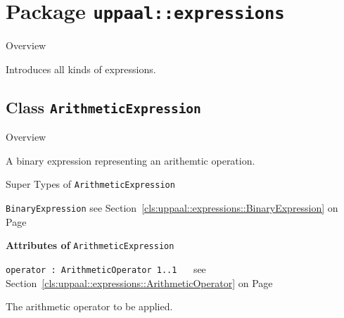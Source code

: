 			\newpage
		\section{Package \bfseries \texttt{uppaal::expressions}\normalfont}
		
		\begin{longdescription}
		\item[Overview]			
				

	

		Introduces all kinds of expressions.		
		\end{longdescription}
	

\subsection{Class \bfseries \texttt{ArithmeticExpression}\normalfont}
\label{cls:uppaal::expressions::ArithmeticExpression} 
	
	\begin{longdescription}
		\item[Overview] 		
				

	

		A binary expression representing an arithemtic operation.		
		\item[Super Types of \texttt{ArithmeticExpression}] ~
			\begin{longdescription}
				\item[\texttt{BinaryExpression}] see Section~\ref{cls:uppaal::expressions::BinaryExpression} on Page~\pageref{cls:uppaal::expressions::BinaryExpression}						\end{longdescription}
		
	
			\item[\textbf{Attributes of} \texttt{ArithmeticExpression}] ~
			\begin{longdescription}
	\item[\texttt{operator : ArithmeticOperator 	\symbol{"5B}1..1\symbol{"5D}
}] ~
	see Section~\ref{cls:uppaal::expressions::ArithmeticOperator} on Page~\pageref{cls:uppaal::expressions::ArithmeticOperator}
	
	\nopagebreak
		
				

	

		The arithmetic operator to be applied.		
			\end{longdescription}
	
	\end{longdescription}
	

